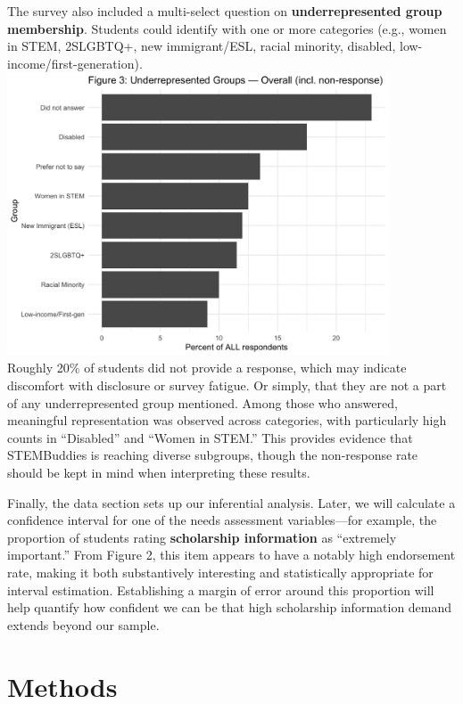 \documentclass[
  letterpaper,
  DIV=11,
  numbers=noendperiod]{scrartcl}
\begin{document}
The survey also included a multi-select question on
\textbf{underrepresented group membership}. Students could identify with
one or more categories (e.g., women in STEM, 2SLGBTQ+, new
immigrant/ESL, racial minority, disabled,
low-income/first-generation).\\
\includegraphics[width=0.85\textwidth,height=\textheight]{plot3.png}\\
Roughly 20\% of students did not provide a response, which may indicate
discomfort with disclosure or survey fatigue. Or simply, that they are
not a part of any underrepresented group mentioned. Among those who
answered, meaningful representation was observed across categories, with
particularly high counts in ``Disabled'' and ``Women in STEM.'' This
provides evidence that STEMBuddies is reaching diverse subgroups, though
the non-response rate should be kept in mind when interpreting these
results.

Finally, the data section sets up our inferential analysis. Later, we
will calculate a confidence interval for one of the needs assessment
variables---for example, the proportion of students rating
\textbf{scholarship information} as ``extremely important.'' From Figure
2, this item appears to have a notably high endorsement rate, making it
both substantively interesting and statistically appropriate for
interval estimation. Establishing a margin of error around this
proportion will help quantify how confident we can be that high
scholarship information demand extends beyond our sample.

\section{Methods}\label{methods}
\end{document}
